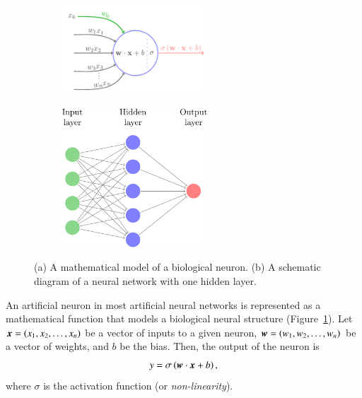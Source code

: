 \documentclass[fleqn,usenatbib]{mnras}
\begin{document}
\begin{figure}
  \centering
  \begin{subfigure}[]{0.49\linewidth}
    \centering
    \includegraphics[width=0.6\textwidth]{figures/neuron.pdf}
    \caption{}
    \label{fig:neuron_a}
  \end{subfigure}
  \begin{subfigure}[]{0.49\linewidth}
    \centering
    \includegraphics[width=0.6\textwidth]{figures/network.pdf}
    \caption{}
    \label{fig:neuron_b}
  \end{subfigure}
  \caption{
    (a) A mathematical model of a biological neuron.
    (b) A schematic diagram of a neural network with one hidden layer.
    }
\end{figure}

An artificial neuron in most artificial neural networks is represented
as a mathematical function that models a biological neural structure
(Figure~\ref{fig:neuron_a}).
Let $\bmath{x}=\left(x_1,x_2,\dots,x_n\right)$ be a vector of inputs to a given neuron,
$\bmath{w}=\left(w_1,w_2,\dots,w_n\right)$ be a vector of weights, and
$b$ be the bias.
Then, the output of the neuron is
\begin{equation}
  y = \sigma \left( \bmath{w} \cdot \bmath{x} + b \right),
  \label{eq:neuron_output}
\end{equation}
where $\sigma$ is the activation function (or \textit{non-linearity}).
\end{document}
